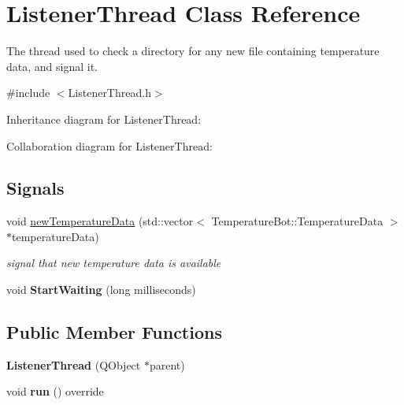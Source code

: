 \hypertarget{classListenerThread}{}\section{Listener\+Thread Class Reference}
\label{classListenerThread}


The thread used to check a directory for any new file containing temperature data, and signal it.  




{\ttfamily \#include $<$Listener\+Thread.\+h$>$}



Inheritance diagram for Listener\+Thread\+:


Collaboration diagram for Listener\+Thread\+:
\subsection*{Signals}
\begin{DoxyCompactItemize}
\item 
\mbox{\label{classListenerThread_ac44c3cb7ca1133631198890fb8e92b4f}} 
void \hyperlink{classListenerThread_ac44c3cb7ca1133631198890fb8e92b4f}{new\+Temperature\+Data} (std\+::vector$<$ Temperature\+Bot\+::\+Temperature\+Data $>$ $\ast$temperature\+Data)
\begin{DoxyCompactList}\small\item\em signal that new temperature data is available \end{DoxyCompactList}\item 
\mbox{\label{classListenerThread_aeb1e2814ade4ad72fa5370c63e92aceb}} 
void {\bfseries Start\+Waiting} (long milliseconds)
\end{DoxyCompactItemize}
\subsection*{Public Member Functions}
\begin{DoxyCompactItemize}
\item 
\mbox{\label{classListenerThread_a968dbaed9be00d44d3f4affe07b28842}} 
{\bfseries Listener\+Thread} (Q\+Object $\ast$parent)
\item 
\mbox{\label{classListenerThread_a6d6d553be533bacbc3907f64535a863c}} 
void {\bfseries run} () override
\end{DoxyCompactItemize}


